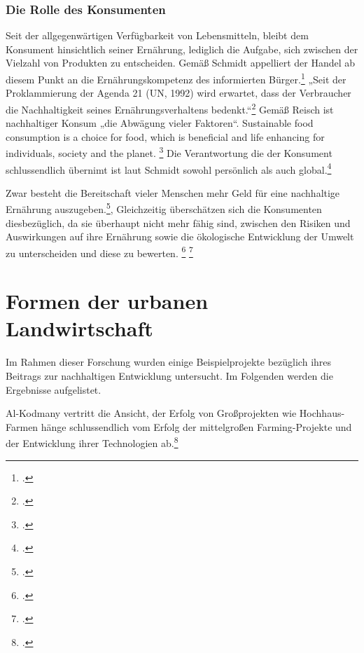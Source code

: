 \documentclass{scrartcl}
\begin{document}
\subsubsection{Die Rolle des Konsumenten}


Seit der allgegenwärtigen Verfügbarkeit von Lebensmitteln, bleibt dem Konsument hinsichtlich seiner Ernährung, lediglich die Aufgabe, sich zwischen der Vielzahl von Produkten zu entscheiden. Gemäß Schmidt appelliert der Handel ab diesem Punkt an die Ernährungskompetenz des informierten Bürger.\footcite[S.20]{SchmidtDieVon} „Seit der Proklammierung der Agenda 21 (UN, 1992) wird erwartet, dass der Verbraucher die Nachhaltigkeit seines Ernährungsverhaltens bedenkt.“\footcite[S.20]{SchmidtDieVon} Gemäß Reisch ist nachhaltiger Konsum „die Abwägung vieler Faktoren“. 
Sustainable food consumption is a choice for food, which is beneficial and life enhancing for individuals, society and the planet. \footcite{article}
Die Verantwortung die der Konsument schlussendlich übernimt ist laut Schmidt sowohl persönlich als auch global.\footcite{SchmidtDieVon}

Zwar besteht die Bereitschaft vieler Menschen mehr Geld für eine nachhaltige Ernährung auszugeben.\footcite[Vgl.][S.10f]{Rodiger2015HowReview},
Gleichzeitig überschätzen sich die Konsumenten diesbezüglich, da sie überhaupt nicht mehr fähig sind, zwischen den Risiken und Auswirkungen auf ihre Ernährung sowie die ökologische Entwicklung der Umwelt zu unterscheiden und diese zu bewerten. \footcite[Vgl.][S.10f]{Rodiger2015HowReview} \footcite[Vgl.][S.121f]{Stierand2008StadtLebensmittel}

\section{Formen der urbanen Landwirtschaft}
Im Rahmen dieser Forschung wurden einige Beispielprojekte bezüglich ihres Beitrags zur nachhaltigen Entwicklung untersucht. 
Im Folgenden werden die Ergebnisse aufgelistet.

Al-Kodmany vertritt die Ansicht, der Erfolg von Großprojekten wie Hochhaus-Farmen hänge schlussendlich vom Erfolg der mittelgroßen Farming-Projekte und der Entwicklung ihrer Technologien ab.\footcite[Vgl.][S.2ff]{Al-Kodmany2018TheCity}
\end{document}
